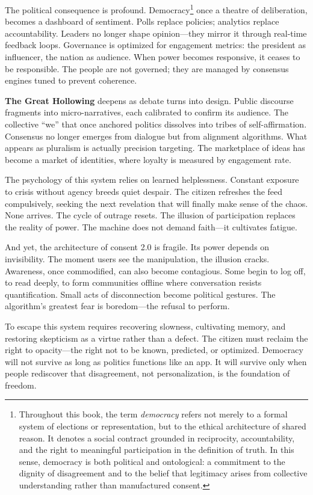 \documentclass[11pt,twoside]{book}
\begin{document}
The political consequence is profound.  Democracy\footnote{Throughout this book, the term \emph{democracy} refers not merely to a formal system of elections or representation, but to the ethical architecture of shared reason.  
It denotes a social contract grounded in reciprocity, accountability, and the right to meaningful participation in the definition of truth.  
In this sense, democracy is both political and ontological: a commitment to the dignity of disagreement and to the belief that legitimacy arises from collective understanding rather than manufactured consent.}  
once a theatre of deliberation, becomes a dashboard of sentiment.  Polls replace policies; analytics replace accountability.  Leaders no longer shape opinion—they mirror it through real-time feedback loops.  Governance is optimized for engagement metrics: the president as influencer, the nation as audience.  When power becomes responsive, it ceases to be responsible.  The people are not governed; they are managed by consensus engines tuned to prevent coherence.

\textbf{The Great Hollowing} deepens as debate turns into design.  Public discourse fragments into micro-narratives, each calibrated to confirm its audience.  The collective “we” that once anchored politics dissolves into tribes of self-affirmation.  Consensus no longer emerges from dialogue but from alignment algorithms.  What appears as pluralism is actually precision targeting.  The marketplace of ideas has become a market of identities, where loyalty is measured by engagement rate.

The psychology of this system relies on learned helplessness.  Constant exposure to crisis without agency breeds quiet despair.  The citizen refreshes the feed compulsively, seeking the next revelation that will finally make sense of the chaos.  None arrives.  The cycle of outrage resets.  The illusion of participation replaces the reality of power.  The machine does not demand faith—it cultivates fatigue.

And yet, the architecture of consent 2.0 is fragile.  Its power depends on invisibility.  The moment users see the manipulation, the illusion cracks.  Awareness, once commodified, can also become contagious.  Some begin to log off, to read deeply, to form communities offline where conversation resists quantification.  Small acts of disconnection become political gestures.  The algorithm’s greatest fear is boredom—the refusal to perform.

To escape this system requires recovering slowness, cultivating memory, and restoring skepticism as a virtue rather than a defect.  The citizen must reclaim the right to opacity—the right not to be known, predicted, or optimized.  Democracy will not survive as long as politics functions like an app.  It will survive only when people rediscover that disagreement, not personalization, is the foundation of freedom.
\end{document}
